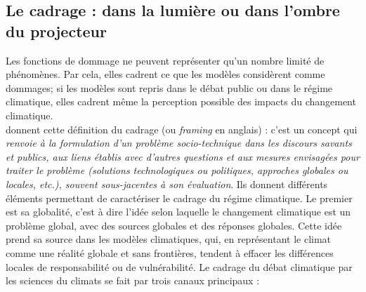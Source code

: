 \subsection{Le cadrage : dans la lumière ou dans l'ombre du projecteur}

Les fonctions de dommage ne peuvent représenter qu'un nombre limité de phénomènes. Par cela, elles cadrent ce que les modèles considèrent comme dommages; si les modèles sont repris dans le débat public ou dans le régime climatique, elles cadrent même la perception possible des impacts du changement climatique. \\

\cite{aykut_gouverner_nodate} donnent cette définition du cadrage (ou \emph{framing} en anglais) : c'est un concept qui  \emph{renvoie à la formulation d’un problème socio-technique dans les discours savants et publics, aux liens établis avec d’autres questions et aux mesures envisagées pour traiter le problème (solutions technologiques ou politiques, approches globales ou locales, etc.), souvent sous-jacentes à son évaluation}. Ils donnent différents éléments permettant de caractériser le cadrage du régime climatique. Le premier est sa globalité, c'est à dire l'idée selon laquelle le changement climatique est un problème global, avec des sources globales et des réponses globales. Cette idée prend sa source dans les modèles climatiques, qui, en représentant le climat comme une réalité globale et sans frontières, tendent à effacer les différences locales de responsabilité ou de vulnérabilité. Le cadrage du débat climatique par les sciences du climats se fait par trois canaux principaux : 



